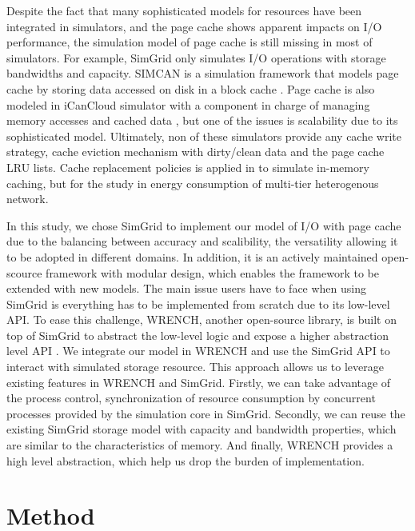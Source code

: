 \documentclass[conference]{IEEEtran}
\begin{document}
			Despite the fact that many sophisticated models for resources have been 
			integrated in simulators, and the page cache shows apparent impacts on I/O
			performance, the simulation model of page cache is still missing in most 
			of simulators.
			For example, SimGrid only simulates I/O operations with storage bandwidths 
			and capacity. 
			SIMCAN is a simulation framework that models page cache by storing data 
			accessed on disk in a block cache \cite{nunez2012simcan}. 
			Page cache is also modeled in iCanCloud simulator with a component in charge 
			of managing memory accesses and cached data \cite{nunez2012icancloud}, 
			but one of the issues is scalability due to its sophisticated model.
			Ultimately, non of these simulators provide any cache write strategy, 
			cache eviction mechanism with dirty/clean data and the page cache LRU lists. 
			Cache replacement policies is applied in \cite{xu2018saving} to simulate 
			in-memory caching, but for the study in energy consumption of multi-tier 
			heterogenous network.
			
			In this study, we chose SimGrid to implement our model of I/O with page cache 
			due to the balancing between accuracy and scalibility, the versatility allowing it 
			to be adopted in different domains. 
			In addition, it is an actively maintained open-scource framework with 
			modular design, which enables the framework to be extended with new models. 
			The main issue users have to face when using SimGrid is everything has to be 
			implemented from scratch due to its low-level API. 
			To ease this challenge, WRENCH, another open-source library, is built on top 
			of SimGrid to abstract the low-level logic and expose a higher abstraction 
			level API \cite{casanova2018wrench}. 
			We integrate our model in WRENCH and use the SimGrid API to interact with 
			simulated storage resource.
			This approach allows us to leverage existing features in WRENCH and SimGrid.
			Firstly, we can take advantage of the process control, synchronization of 
			resource consumption by concurrent processes provided by the simulation core 
			in SimGrid. 
			Secondly, we can reuse the existing SimGrid storage model with capacity 
			and bandwidth properties, which are similar to the characteristics of memory.
			And finally, WRENCH provides a high level abstraction, which help us drop 
			the burden of implementation. 
			
	\section{Method}
	\label{method}	
\end{document}
